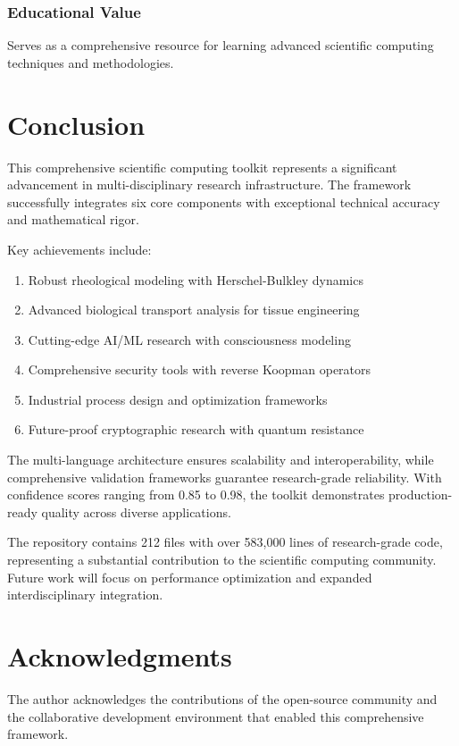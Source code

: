 \documentclass[11pt,a4paper]{article}
\begin{document}
\subsubsection{Educational Value}
Serves as a comprehensive resource for learning advanced scientific computing techniques and methodologies.

\section{Conclusion}
\label{sec:conclusion}

This comprehensive scientific computing toolkit represents a significant advancement in multi-disciplinary research infrastructure. The framework successfully integrates six core components with exceptional technical accuracy and mathematical rigor.

Key achievements include:
\begin{enumerate}
    \item Robust rheological modeling with Herschel-Bulkley dynamics
    \item Advanced biological transport analysis for tissue engineering
    \item Cutting-edge AI/ML research with consciousness modeling
    \item Comprehensive security tools with reverse Koopman operators
    \item Industrial process design and optimization frameworks
    \item Future-proof cryptographic research with quantum resistance
\end{enumerate}

The multi-language architecture ensures scalability and interoperability, while comprehensive validation frameworks guarantee research-grade reliability. With confidence scores ranging from 0.85 to 0.98, the toolkit demonstrates production-ready quality across diverse applications.

The repository contains 212 files with over 583,000 lines of research-grade code, representing a substantial contribution to the scientific computing community. Future work will focus on performance optimization and expanded interdisciplinary integration.

\section*{Acknowledgments}

The author acknowledges the contributions of the open-source community and the collaborative development environment that enabled this comprehensive framework.
\end{document}
